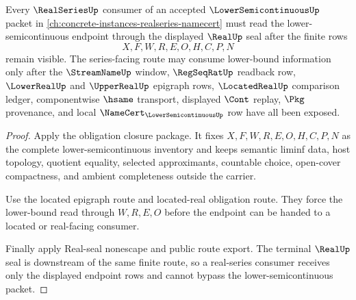 \begin{theorem}
\label{thm:lower-semicontinuous-real-series-sibling-route}
Every $\RealSeriesUp$ consumer of an accepted $\LowerSemicontinuousUp$ packet in \autoref{ch:concrete-instances-realseries-namecert} must read the lower-semicontinuous endpoint through the displayed $\RealUp$ seal after the finite rows
$$
X,F,W,R,E,O,H,C,P,N
$$
remain visible. The series-facing route may consume lower-bound information only after the $\StreamNameUp$ window, $\RegSeqRatUp$ readback row, $\LowerRealUp$ and $\UpperRealUp$ epigraph rows, $\LocatedRealUp$ comparison ledger, componentwise $\hsame$ transport, displayed $\Cont$ replay, $\Pkg$ provenance, and local $\NameCert_{\LowerSemicontinuousUp}$ row have all been exposed.
\end{theorem}
\begin{proof}
Apply the obligation closure package. It fixes $X,F,W,R,E,O,H,C,P,N$ as the complete lower-semicontinuous inventory and keeps semantic liminf data, host topology, quotient equality, selected approximants, countable choice, open-cover compactness, and ambient completeness outside the carrier.

Use the located epigraph route and located-real obligation route. They force the lower-bound read through $W,R,E,O$ before the endpoint can be handed to a located or real-facing consumer.

Finally apply Real-seal nonescape and public route export. The terminal $\RealUp$ seal is downstream of the same finite route, so a real-series consumer receives only the displayed endpoint rows and cannot bypass the lower-semicontinuous packet.
\end{proof}

